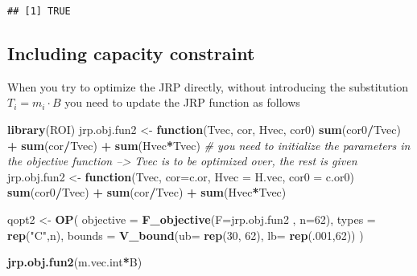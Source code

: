 \documentclass[
]{article}
\newenvironment{Shaded}{\begin{snugshade}}{\end{snugshade}}
\newcommand{\CommentTok}[1]{\textcolor[rgb]{0.56,0.35,0.01}{\textit{#1}}}
\newcommand{\ControlFlowTok}[1]{\textcolor[rgb]{0.13,0.29,0.53}{\textbf{#1}}}
\newcommand{\DataTypeTok}[1]{\textcolor[rgb]{0.13,0.29,0.53}{#1}}
\newcommand{\DecValTok}[1]{\textcolor[rgb]{0.00,0.00,0.81}{#1}}
\newcommand{\KeywordTok}[1]{\textcolor[rgb]{0.13,0.29,0.53}{\textbf{#1}}}
\newcommand{\NormalTok}[1]{#1}
\newcommand{\OperatorTok}[1]{\textcolor[rgb]{0.81,0.36,0.00}{\textbf{#1}}}
\newcommand{\StringTok}[1]{\textcolor[rgb]{0.31,0.60,0.02}{#1}}
\begin{document}
\begin{verbatim}
## [1] TRUE
\end{verbatim}

\hypertarget{including-capacity-constraint}{%
\subsection{Including capacity
constraint}\label{including-capacity-constraint}}

When you try to optimize the JRP directly, without introducing the
substitution \(T_i = m_i \cdot B\) you need to update the JRP function
as follows

\begin{Shaded}
\begin{Highlighting}[]
\KeywordTok{library}\NormalTok{(ROI)}
\NormalTok{jrp.obj.fun2 <-}\StringTok{ }\ControlFlowTok{function}\NormalTok{(Tvec, cor, Hvec, cor0) }\KeywordTok{sum}\NormalTok{(cor0}\OperatorTok{/}\NormalTok{Tvec) }\OperatorTok{+}\StringTok{ }\KeywordTok{sum}\NormalTok{(cor}\OperatorTok{/}\NormalTok{Tvec) }\OperatorTok{+}\StringTok{ }\KeywordTok{sum}\NormalTok{(Hvec}\OperatorTok{*}\NormalTok{Tvec)}
\CommentTok{# you need to initialize the parameters in the objective function --> Tvec is to be optimized over, the rest is given}
\NormalTok{jrp.obj.fun2 <-}\StringTok{ }\ControlFlowTok{function}\NormalTok{(Tvec, }\DataTypeTok{cor=}\NormalTok{c.or, }\DataTypeTok{Hvec =}\NormalTok{ H.vec, }\DataTypeTok{cor0 =}\NormalTok{ c.or0) }\KeywordTok{sum}\NormalTok{(cor0}\OperatorTok{/}\NormalTok{Tvec) }\OperatorTok{+}\StringTok{ }\KeywordTok{sum}\NormalTok{(cor}\OperatorTok{/}\NormalTok{Tvec) }\OperatorTok{+}\StringTok{ }\KeywordTok{sum}\NormalTok{(Hvec}\OperatorTok{*}\NormalTok{Tvec)}

\NormalTok{qopt2 <-}\StringTok{ }\KeywordTok{OP}\NormalTok{(}
  \DataTypeTok{objective =} \KeywordTok{F_objective}\NormalTok{(}\DataTypeTok{F=}\NormalTok{jrp.obj.fun2 , }\DataTypeTok{n=}\DecValTok{62}\NormalTok{),}
  \DataTypeTok{types =} \KeywordTok{rep}\NormalTok{(}\StringTok{"C"}\NormalTok{,n),}
  \DataTypeTok{bounds =} \KeywordTok{V_bound}\NormalTok{(}\DataTypeTok{ub=} \KeywordTok{rep}\NormalTok{(}\DecValTok{30}\NormalTok{, }\DecValTok{62}\NormalTok{), }\DataTypeTok{lb=} \KeywordTok{rep}\NormalTok{(.}\DecValTok{001}\NormalTok{,}\DecValTok{62}\NormalTok{))}
\NormalTok{) }

\KeywordTok{jrp.obj.fun2}\NormalTok{(m.vec.int}\OperatorTok{*}\NormalTok{B)}
\end{Highlighting}
\end{Shaded}
\end{document}
